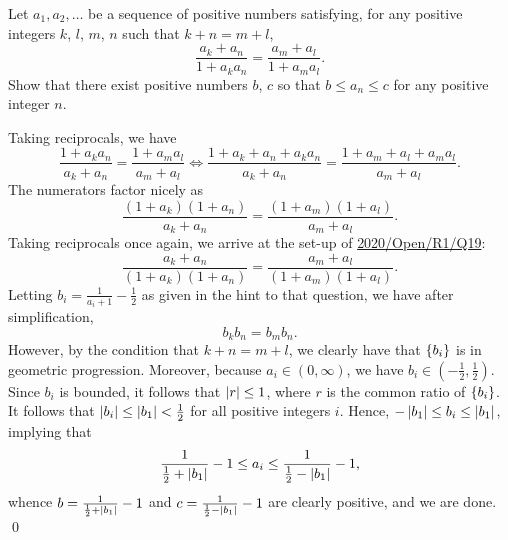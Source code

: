 \begin{question}\label{A::2024-S-2-5}
    Let $a_1, a_2, \ldots$ be a sequence of positive numbers satisfying, for any positive integers $k$, $l$, $m$, $n$ such that $k + n = m + l$, \[\frac{a_k + a_n}{1 + a_k a_n} = \frac{a_m + a_l}{1 + a_m a_l}.\] Show that there exist positive numbers $b$, $c$ so that $b \leq a_n \leq c$ for any positive integer $n$.
\end{question}
\begin{solution*}[\credit{https://www.youtube.com/watch?v=Mrjm7aWXoNQ}{Way Tan}]
    Taking reciprocals, we have \[\frac{1 + a_k a_n}{a_k + a_n} = \frac{1 + a_m a_l}{a_m + a_l} \iff \frac{1 + a_k + a_n + a_k a_n}{a_k + a_n} = \frac{1 + a_m + a_l + a_m a_l}{a_m + a_l}.\] The numerators factor nicely as \[\frac{(1 + a_k)(1 + a_n)}{a_k + a_n} = \frac{(1 + a_m)(1 + a_l)}{a_m + a_l}.\] Taking reciprocals once again, we arrive at the set-up of \hyperref[A::2020-O-1-19]{2020/Open/R1/Q19}: \[\frac{a_k + a_n}{(1 + a_k)(1 + a_n)} = \frac{a_m + a_l}{(1 + a_m)(1 + a_l)}.\] Letting $b_i = \frac{1}{a_i + 1} - \frac12$ as given in the hint to that question, we have after simplification, \[b_kb_n = b_m b_n.\] However, by the condition that $k + n = m + l$, we clearly have that $\left\lbrace b_i \right\rbrace$ is in geometric progression. Moreover, because $a_i \in (0, \infty)$, we have $b_i \in (-\frac12, \frac12)$. Since $b_i$ is bounded, it follows that $\left\lvert r \right\rvert \leq 1$, where $r$ is the common ratio of $\left\lbrace b_i \right\rbrace$. It follows that $\left\lvert b_i \right\rvert \leq \left\lvert b_1 \right\rvert < \frac12 $ for all positive integers $i$. Hence, $-\left\lvert b_1 \right\rvert \leq b_i \leq \left\lvert b_1 \right\rvert$, implying that \[\frac1{\frac12 + \left\lvert b_1 \right\rvert} - 1 \leq a_i \leq \frac1{\frac12-\left\lvert b_1 \right\rvert} - 1,\] whence $b = \frac1{\frac12 + \left\lvert b_1 \right\rvert} - 1$ and $c = \frac1{\frac12-\left\lvert b_1 \right\rvert} - 1$ are clearly positive, and we are done. \qed
\end{solution*}
